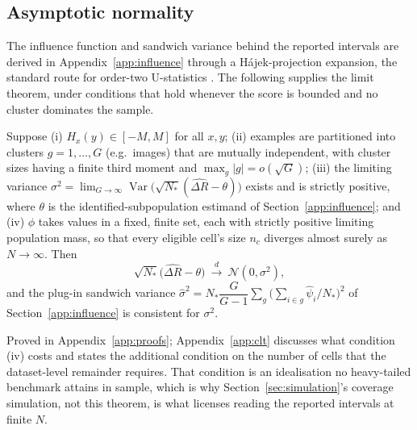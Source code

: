 \subsection{Asymptotic normality}\label{sec:asymptotic}

The influence function and sandwich variance behind the reported intervals are derived in
Appendix~\ref{app:influence} through a H\'ajek-projection expansion, the standard route for
order-two U-statistics \citep{serfling1980approximation,vandervaart1998asymptotic}. The following supplies
the limit theorem, under conditions that hold whenever the score is bounded and no cluster
dominates the sample.

\begin{theorem}\label{thm:clt}
Suppose (i) $H_x(y)\in[-M,M]$ for all $x,y$; (ii) examples are partitioned into clusters
$g=1,\dots,G$ (e.g.\ images) that are mutually independent, with cluster sizes having a
finite third moment and $\max_g|g|=o(\sqrt{G})$; (iii) the limiting variance
$\sigma^2=\lim_{G\to\infty}\operatorname{Var}\!\bigl(\sqrt{N_*}(\widehat{\Delta R}-\theta)\bigr)$
exists and is strictly positive, where $\theta$ is the identified-subpopulation estimand
of Section~\ref{app:influence}; and (iv) $\phi$ takes values in a fixed, finite set,
each with strictly positive limiting population mass, so that every eligible cell's size
$n_c$ diverges almost surely as $N\to\infty$. Then
\begin{equation}
\sqrt{N_*}\bigl(\widehat{\Delta R}-\theta\bigr)\ \xrightarrow{d}\ \mathcal N(0,\sigma^2),
\end{equation}
and the plug-in sandwich variance $\widehat\sigma^2=N_*\dfrac{G}{G-1}\sum_{g}\bigl(\sum_{i\in g}\widehat\psi_i/N_*\bigr)^2$
of Section~\ref{app:influence} is consistent for $\sigma^2$.
\end{theorem}

\noindent
Proved in Appendix~\ref{app:proofs}; Appendix~\ref{app:clt} discusses what condition (iv)
costs and states the additional condition on the number of cells that the dataset-level
remainder requires. That condition is an idealisation no heavy-tailed benchmark attains in
sample, which is why
Section~\ref{sec:simulation}'s coverage simulation, not this theorem, is what licenses
reading the reported intervals at finite $N$.

